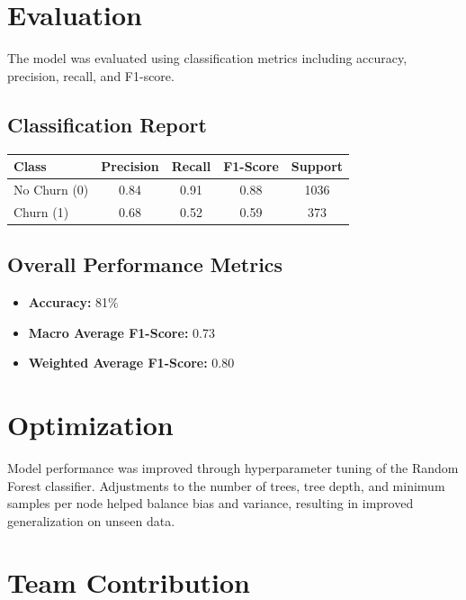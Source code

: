 \documentclass[12pt]{article}
\begin{document}
\section{Evaluation}

The model was evaluated using classification metrics including accuracy, precision, recall, and F1-score.

\subsection*{Classification Report}

\begin{table}[h]
\centering
\begin{tabular}{lcccc}
\toprule
\textbf{Class} & \textbf{Precision} & \textbf{Recall} & \textbf{F1-Score} & \textbf{Support} \\
\midrule
No Churn (0) & 0.84 & 0.91 & 0.88 & 1036 \\
Churn (1) & 0.68 & 0.52 & 0.59 & 373 \\
\bottomrule
\end{tabular}
\end{table}

\subsection*{Overall Performance Metrics}

\begin{itemize}
    \item \textbf{Accuracy:} 81\%
    \item \textbf{Macro Average F1-Score:} 0.73
    \item \textbf{Weighted Average F1-Score:} 0.80
\end{itemize}

\section{Optimization}

Model performance was improved through hyperparameter tuning of the Random Forest classifier. Adjustments to the number of trees, tree depth, and minimum samples per node helped balance bias and variance, resulting in improved generalization on unseen data.

\section{Team Contribution}
\end{document}
